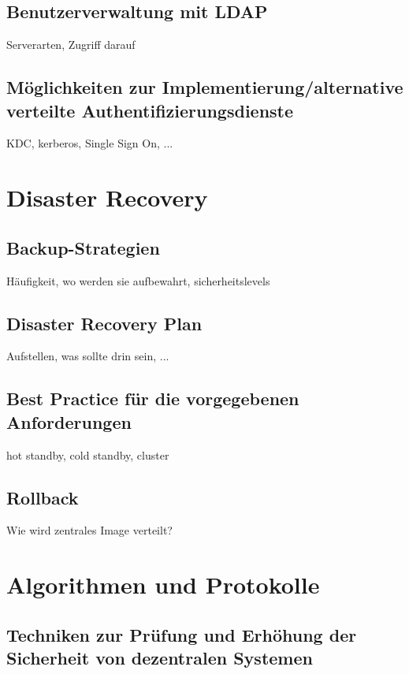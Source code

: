 \documentclass[letterpaper, 12pt]{article}
\let\tempsection\section
\renewcommand\section[1]{\vspace{-0.3cm}\tempsection{#1}\vspace{-0.3cm}}
\let\tempsubsection\subsection
\renewcommand\subsection[1]{\vspace{0cm}\tempsubsection{#1}\vspace{0cm}}
\begin{document}
\subsection{Benutzerverwaltung mit LDAP}

Serverarten, Zugriff darauf

\subsection{Möglichkeiten zur Implementierung/alternative verteilte Authentifizierungsdienste}

KDC, kerberos, Single Sign On, ...

\clearpage

\section{Disaster Recovery}

\subsection{Backup-Strategien}

Häufigkeit, wo werden sie aufbewahrt, sicherheitslevels

\subsection{Disaster Recovery Plan}

Aufstellen, was sollte drin sein, ...

\subsection{Best Practice für die vorgegebenen Anforderungen}

hot standby, cold standby, cluster

\subsection{Rollback}

Wie wird zentrales Image verteilt?

\clearpage

\section{Algorithmen und Protokolle}

\subsection{Techniken zur Prüfung und Erhöhung der Sicherheit von dezentralen Systemen}
\end{document}
